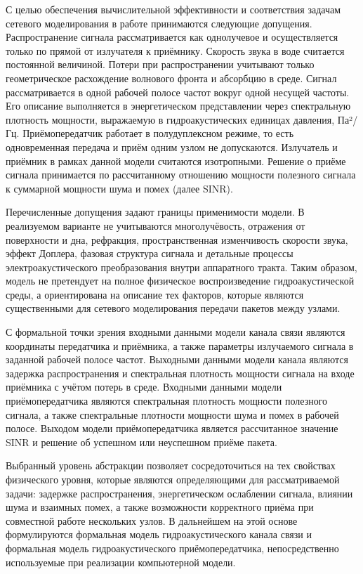 \documentclass[
    numbers=section,
    document-code={ВКРБ--09.03.04--10.19--XX--26--81}
]{../latex/fqw}
\begin{document}
    С целью обеспечения вычислительной эффективности и соответствия задачам сетевого моделирования
    в работе принимаются следующие допущения.
    Распространение сигнала рассматривается как однолучевое и осуществляется
    только по прямой от излучателя к приёмнику.
    Скорость звука в воде считается постоянной величиной.
    Потери при распространении учитывают только геометрическое расхождение волнового фронта и абсорбцию в среде.
    Сигнал рассматривается в одной рабочей полосе частот вокруг одной несущей частоты.
    Его описание выполняется в энергетическом представлении через спектральную плотность мощности,
    выражаемую в гидроакустических единицах давления, Па²/Гц.
    Приёмопередатчик работает в полудуплексном режиме,
    то есть одновременная передача и приём одним узлом не допускаются.
    Излучатель и приёмник в рамках данной модели считаются изотропными.
    Решение о приёме сигнала принимается по рассчитанному
    отношению мощности полезного сигнала к суммарной мощности шума и помех (далее SINR).

    Перечисленные допущения задают границы применимости модели.
    В реализуемом варианте не учитываются
    многолучёвость,
    отражения от поверхности и дна,
    рефракция,
    пространственная изменчивость скорости звука,
    эффект Доплера,
    фазовая структура сигнала и детальные процессы
    электроакустического преобразования внутри аппаратного тракта.
    Таким образом, модель не претендует на полное физическое воспроизведение гидроакустической среды,
    а ориентирована на описание тех факторов,
    которые являются существенными для сетевого моделирования передачи пакетов между узлами.

    С формальной точки зрения входными данными модели канала связи являются координаты передатчика и приёмника,
    а также параметры излучаемого сигнала в заданной рабочей полосе частот.
    Выходными данными модели канала являются
    задержка распространения и
    спектральная плотность мощности сигнала на входе приёмника с учётом потерь в среде.
    Входными данными модели приёмопередатчика являются спектральная плотность мощности полезного сигнала,
    а также спектральные плотности мощности шума и помех в рабочей полосе.
    Выходом модели приёмопередатчика является рассчитанное значение SINR и
    решение об успешном или неуспешном приёме пакета.

    Выбранный уровень абстракции позволяет сосредоточиться на тех свойствах физического уровня,
    которые являются определяющими для рассматриваемой задачи:
    задержке распространения,
    энергетическом ослаблении сигнала,
    влиянии шума и взаимных помех,
    а также возможности корректного приёма при совместной работе нескольких узлов.
    В дальнейшем на этой основе формулируются
    формальная модель гидроакустического канала связи и
    формальная модель гидроакустического приёмопередатчика,
    непосредственно используемые при реализации компьютерной модели.
\end{document}

